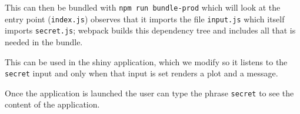 \documentclass[
]{krantz}
\makeatletter
\newenvironment{Shaded}{\begin{snugshade}}{\end{snugshade}}
\newcommand{\ControlFlowTok}[1]{\textcolor[rgb]{0.27,0.27,0.27}{\textbf{#1}}}
\newcommand{\DataTypeTok}[1]{\textcolor[rgb]{0.27,0.27,0.27}{#1}}
\newcommand{\KeywordTok}[1]{\textcolor[rgb]{0.27,0.27,0.27}{\textbf{#1}}}
\newcommand{\NormalTok}[1]{#1}
\newcommand{\OperatorTok}[1]{\textcolor[rgb]{0.43,0.43,0.43}{\textbf{#1}}}
\newcommand{\StringTok}[1]{\textcolor[rgb]{0.5,0.5,0.5}{#1}}
\newenvironment{kframe}{%
\medskip{}
\setlength{\fboxsep}{.8em}
 \def\at@end@of@kframe{}%
 \ifinner\ifhmode%
  \def\at@end@of@kframe{\end{minipage}}%
  \begin{minipage}{\columnwidth}%
 \fi\fi%
 \def\FrameCommand##1{\hskip\@totalleftmargin \hskip-\fboxsep
 \colorbox{shadecolor}{##1}\hskip-\fboxsep
     \hskip-\linewidth \hskip-\@totalleftmargin \hskip\columnwidth}%
 \MakeFramed {\advance\hsize-\width
   \@totalleftmargin\z@ \linewidth\hsize
   \@setminipage}}%
 {\par\unskip\endMakeFramed%
 \at@end@of@kframe}
\renewenvironment{Shaded}{\begin{kframe}}{\end{kframe}}
\makeatother
\begin{document}
This can then be bundled with \texttt{npm\ run\ bundle-prod} which will look at the entry point (\texttt{index.js}) observes that it imports the file \texttt{input.js} which itself imports \texttt{secret.js}; webpack builds this dependency tree and includes all that is needed in the bundle.

This can be used in the shiny application, which we modify so it listens to the \texttt{secret} input and only when that input is set renders a plot and a message.

\begin{Shaded}
\end{Shaded}

Once the application is launched the user can type the phrase \texttt{secret} to see the content of the application.
\end{document}
